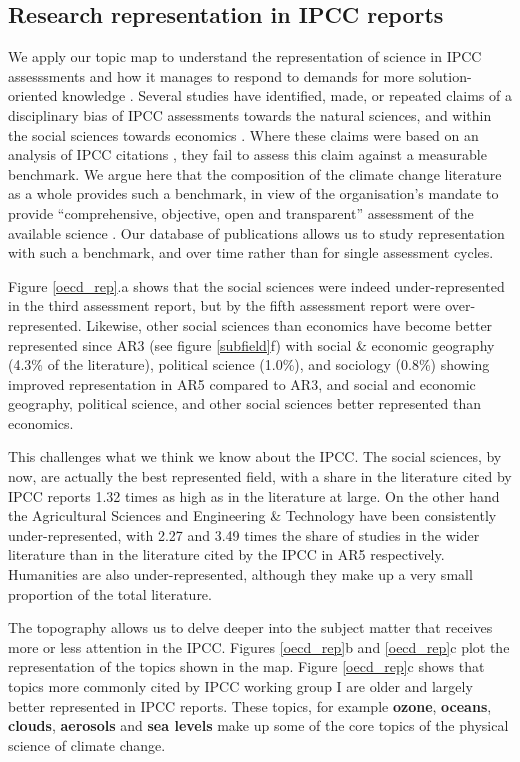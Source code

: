 \documentclass{article}
\begin{document}
\begin{linenumbers}
		
		\subsection*{Research representation in IPCC reports}
		We apply our topic map to understand the representation of science in IPCC assesssments and how it manages to respond to demands for more solution-oriented knowledge \cite{Kowarsch2017}. Several studies have identified, made, or repeated claims of a disciplinary bias of IPCC assessments towards the natural sciences, and within the social sciences towards economics \cite{Bjurström2011, Victor2015, Hulme2010, Corbera2016}. Where these claims were based on an analysis of IPCC citations \cite{Bjurström2011}, they fail to assess this claim against a measurable benchmark. We argue here that the composition of the climate change literature as a whole provides such a benchmark, in view of the organisation's mandate to provide ``comprehensive, objective, open and transparent'' assessment of the available science \cite{IPCC2013}. Our database of publications allows us to study representation with such a benchmark, and over time rather than for single assessment cycles.
		
		Figure \ref{oecd_rep}.a shows that the social sciences were indeed under-represented in the third assessment report, but by the fifth assessment report were over-represented. Likewise, other social sciences than economics have become better represented since AR3  (see figure \ref{subfield}f) with social \& economic geography (4.3\% of the literature), political science (1.0\%), and sociology (0.8\%) showing improved representation in AR5 compared to AR3, and social and economic geography, political science, and other social sciences better represented than economics. 
		
		This challenges what we think we know about the IPCC. The social sciences, by now, are actually the best represented field, with a share in the literature cited by IPCC reports 1.32 times as high as in the literature at large.  On the other hand the Agricultural Sciences and Engineering \& Technology have been consistently under-represented, with 2.27 and 3.49 times the share of studies in the wider literature than in the literature cited by the IPCC in AR5 respectively. Humanities are also under-represented, although they make up a very small proportion of the total literature.
		
		
		The topography allows us to delve deeper into the subject matter that receives more or less attention in the IPCC. Figures \ref{oecd_rep}b and \ref{oecd_rep}c plot the representation of the topics shown in the map. Figure \ref{oecd_rep}c shows that topics more commonly cited by IPCC working group I are older and largely better represented in IPCC reports. These topics, for example \textbf{ozone}, \textbf{oceans}, \textbf{clouds}, \textbf{aerosols} and \textbf{sea levels} make up some of the core topics of the physical science of climate change.
		

\end{linenumbers}
\end{document}
